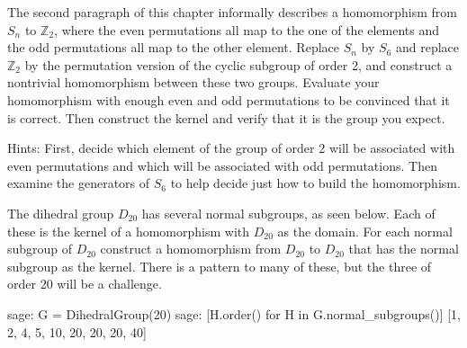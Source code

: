 \begin{sageverbatim}\end{sageverbatim}
%
%
The second paragraph of this chapter informally describes a homomorphism from $S_n$ to ${\mathbb Z}_2$, where the even permutations all map to the one of the elements and the odd permutations all map to the other element.  Replace $S_n$ by $S_6$ and replace ${\mathbb Z}_2$ by the permutation version of the cyclic subgroup of order 2, and construct a nontrivial homomorphism between these two groups.  Evaluate your homomorphism with enough even and odd permutations to be convinced that it is correct.  Then construct the kernel and verify that it is the group you expect.\par
%
Hints:  First, decide which element of the group of order 2 will be associated with even permutations and which will be associated with odd permutations.  Then examine the generators of $S_6$ to help decide just how to build the homomorphism.
\begin{sageverbatim}\end{sageverbatim}
%
%
The dihedral group $D_{20}$ has several normal subgroups, as seen below.  Each of these is the kernel of a homomorphism with $D_{20}$ as the domain.  For each normal subgroup of $D_{20}$ construct a homomorphism from $D_{20}$ to $D_{20}$ that has the normal subgroup as the kernel.  There is a pattern to many of these, but the three of order 20 will be a challenge.
%
\begin{sageexample}
sage: G = DihedralGroup(20)
sage: [H.order() for H in G.normal_subgroups()]
[1, 2, 4, 5, 10, 20, 20, 20, 40]
\end{sageexample}
%
%
\begin{sageverbatim}\end{sageverbatim}
